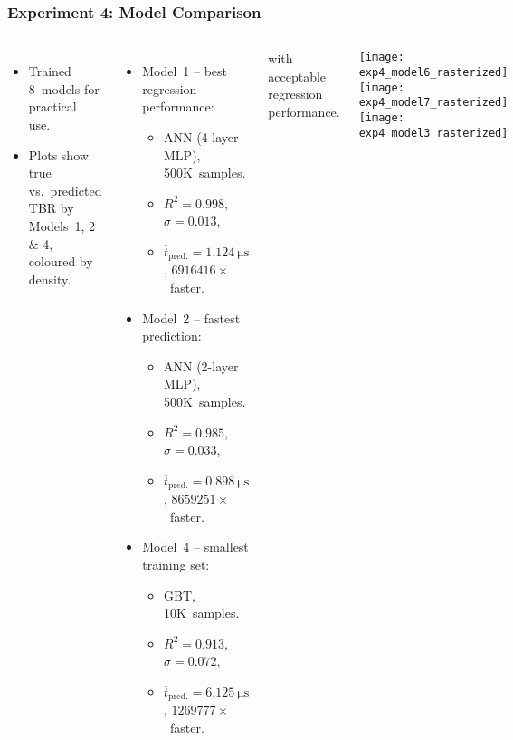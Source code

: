 \begin{frame}
	\frametitle{Experiment 4: Model Comparison}
	\begin{columns}
		\begin{itemize}
			\item
				Trained 8~models for practical use.
			\item
				Plots show true vs.~predicted TBR by Models~1, 2 \& 4,
				coloured by density.
		\end{itemize}

		\vspace{0.5em}

		\begin{itemize}
			\item
				Model~1 -- best regression performance:
				\begin{itemize}
					\item
						ANN (4-layer MLP), 500K~samples.
					\item
						$R^2=\num{0.998}$,
						$\sigma=\num{0.013}$,
					\item
						$\overline{t}_{\text{pred.}}=\SI{1.124}{\micro\second}$,
						$\num{6916416} \times$~faster.
				\end{itemize}
			\item
				Model~2 -- fastest prediction:\textsuperscript{\textdagger}
				\begin{itemize}
					\item
						ANN (2-layer MLP), 500K~samples.
					\item
						$R^2=\num{0.985}$,
						$\sigma=\num{0.033}$,
					\item
						$\overline{t}_{\text{pred.}}=\SI{0.898}{\micro\second}$,
						$\num{8659251} \times$~faster.
				\end{itemize}
			\item
				Model~4 -- smallest training set:\textsuperscript{\textdagger}
				\begin{itemize}
					\item
						GBT, 10K~samples.
					\item
						$R^2=\num{0.913}$,
						$\sigma=\num{0.072}$,
					\item
						$\overline{t}_{\text{pred.}}=\SI{6.125}{\micro\second}$,
						$\num{1269777} \times$~faster.
				\end{itemize}
		\end{itemize}

		{\footnotesize
			\textsuperscript{\textdagger}
			with acceptable regression performance.
		}

		\texttt{[image: exp4\_model6\_rasterized]}\vspace{-8pt}\\
		\texttt{[image: exp4\_model7\_rasterized]}\vspace{-8pt}\\
		\texttt{[image: exp4\_model3\_rasterized]}
	\end{columns}
\end{frame}
